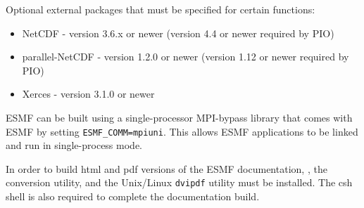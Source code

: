Optional external packages that must be specified for certain functions:
\begin{itemize}
\item NetCDF - version 3.6.x or newer (version 4.4 or newer required by PIO)
\item parallel-NetCDF - version 1.2.0 or newer (version 1.12 or newer required by PIO)
\item Xerces - version 3.1.0 or newer
\end{itemize}  

ESMF can be built using a single-processor MPI-bypass library
that comes with ESMF by setting {\tt ESMF\_COMM=mpiuni}. This allows ESMF applications
to be linked and run in single-process mode.

In order to build html and pdf versions of the ESMF documentation, 
,
the 
conversion utility, and the Unix/Linux {\tt dvipdf} utility must be installed.
The csh shell is also required to complete the documentation build.

